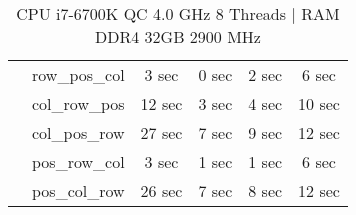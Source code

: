 \documentclass[11pt]{article}
\begin{document}
\begin{table}[H]
\begin{tabular}{ |c|c|c|c|c|c|  }
                            & row\_pos\_col & 3 sec & 0 sec & 2 sec & 6 sec \\
                            & col\_row\_pos & 12 sec & 3 sec & 4 sec & 10 sec \\  
                            & col\_pos\_row & 27 sec & 7 sec & 9 sec & 12 sec \\
                            & pos\_row\_col & 3 sec & 1 sec & 1 sec & 6 sec \\
                            & pos\_col\_row & 26 sec & 7 sec & 8 sec & 12 sec \\
\hline
\end{tabular}
\caption{CPU i7-6700K QC 4.0 GHz 8 Threads $|$ RAM DDR4 32GB 2900 MHz }
\end{table}
\end{document}
